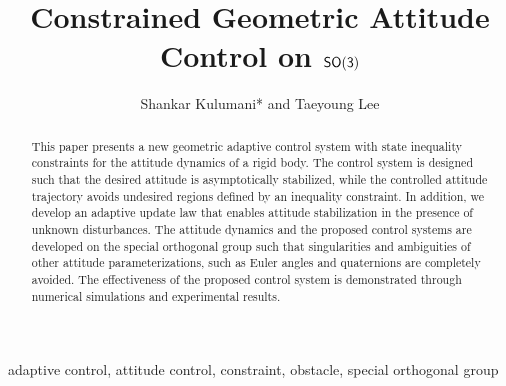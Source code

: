 \documentclass[10pt,fleqn]{IJCAS}  %
\begin{document}
\title{\LARGE \textbf{Constrained Geometric Attitude Control on \( \mathsf{SO(3)} \)} }

\author{Shankar Kulumani* and Taeyoung Lee}%

\begin{abstract}
This paper presents a new geometric adaptive control system with state inequality constraints for the attitude dynamics of a rigid body. 
The control system is designed such that the desired attitude is asymptotically stabilized, while the controlled attitude trajectory avoids undesired regions defined by an inequality constraint. 
In addition, we develop an adaptive update law that enables attitude stabilization in the presence of unknown disturbances. 
The attitude dynamics and the proposed control systems are developed on the special orthogonal group such that singularities and ambiguities of other attitude parameterizations, such as Euler angles and quaternions are completely avoided. 
The effectiveness of the proposed control system is demonstrated through numerical simulations and experimental results.
\end{abstract}

\begin{keywords}
adaptive control, attitude control, constraint, obstacle, special orthogonal group
\end{keywords}

\maketitle %

\end{document}
